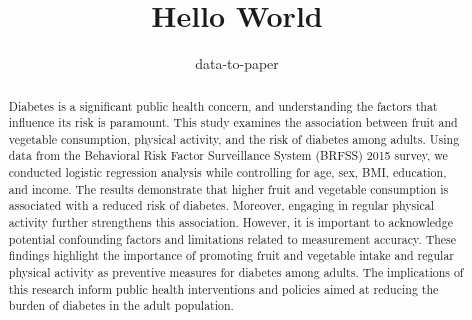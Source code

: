 \documentclass[12pt]{article}
\title{Hello World}
\author{data-to-paper}
\begin{document}
\maketitle

\begin{abstract}
Diabetes is a significant public health concern, and understanding the factors that influence its risk is paramount. This study examines the association between fruit and vegetable consumption, physical activity, and the risk of diabetes among adults. Using data from the Behavioral Risk Factor Surveillance System (BRFSS) 2015 survey, we conducted logistic regression analysis while controlling for age, sex, BMI, education, and income. The results demonstrate that higher fruit and vegetable consumption is associated with a reduced risk of diabetes. Moreover, engaging in regular physical activity further strengthens this association. However, it is important to acknowledge potential confounding factors and limitations related to measurement accuracy. These findings highlight the importance of promoting fruit and vegetable intake and regular physical activity as preventive measures for diabetes among adults. The implications of this research inform public health interventions and policies aimed at reducing the burden of diabetes in the adult population.
\end{abstract}
\end{document}
